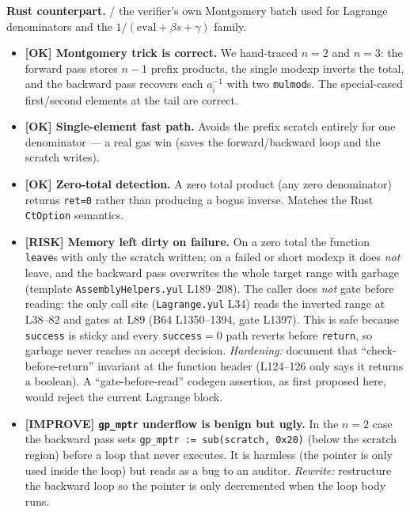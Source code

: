 \textbf{Rust counterpart.}  / the verifier's
own Montgomery batch used for Lagrange denominators and the
$1/(\text{eval}+\beta s+\gamma)$ family.

\begin{itemize}
  \item \textcolor{tracegreen}{\textbf{[OK] Montgomery trick is correct.}}
        We hand-traced $n=2$ and $n=3$: the forward pass stores
        $n-1$ prefix products, the single modexp inverts the total, and
        the backward pass recovers each $a_i^{-1}$ with two
        \texttt{mulmod}s. The special-cased first/second elements at the
        tail are correct.
  \item \textcolor{tracegreen}{\textbf{[OK] Single-element fast path.}}
        Avoids the prefix scratch entirely for one denominator --- a
        real gas win (saves the forward/backward loop and the scratch
        writes).
  \item \textcolor{tracegreen}{\textbf{[OK] Zero-total detection.}} A
        zero total product (any zero denominator) returns
        \texttt{ret=0} rather than producing a bogus inverse. Matches
        the Rust \texttt{CtOption} semantics.
  \item \textcolor{rustorange}{\textbf{[RISK] Memory left dirty on
        failure.}} On a zero total the function \texttt{leave}s with
        only the scratch written; on a failed or short modexp it does
        \emph{not} leave, and the backward pass overwrites the whole
        target range with garbage (template
        \texttt{AssemblyHelpers.yul} L189--208). 
        The caller does \emph{not} gate before reading: the only call
        site (\texttt{Lagrange.yul} L34) reads the inverted range at
        L38--82 and gates at L89 (B64 L1350--1394, gate L1397). This is
        safe because \texttt{success} is sticky and every
        \texttt{success}$=0$ path reverts before \texttt{return}, so
        garbage never reaches an accept decision. \emph{Hardening:}
        document that ``check-before-return'' invariant at the function
        header (L124--126 only says it returns a boolean). A
        ``gate-before-read'' codegen assertion, as first proposed here,
        would reject the current Lagrange block. 
  \item \textcolor{codegenblue}{\textbf{[IMPROVE] \texttt{gp\_mptr}
        underflow is benign but ugly.}} In the $n=2$ case the backward
        pass sets \texttt{gp\_\allowbreak{}mptr := sub(scratch, 0x20)} (below the
        scratch region) before a loop that never executes. It is
        harmless (the pointer is only used inside the loop) but reads as
        a bug to an auditor. \emph{Rewrite:} restructure the backward
        loop so the pointer is only decremented when the loop body runs.
\end{itemize}

